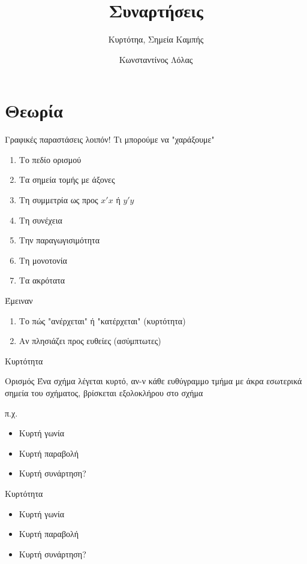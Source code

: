 \documentclass[greek]{beamer}
\title{Συναρτήσεις}
\subtitle{Κυρτότηα, Σημεία Καμπής}
\author[Λόλας]{Κωνσταντίνος Λόλας}
\date{}
\begin{document}
\begin{frame}
 \titlepage
\end{frame}

\section{Θεωρία}
\begin{frame}{Γραφικές παραστάσεις λοιπόν!}
 Τι μπορούμε να "χαράξουμε"
 \begin{enumerate}
  \item Το πεδίο ορισμού
  \item Τα σημεία τομής με άξονες
  \item Τη συμμετρία ως προς $x'x$ ή $y'y$
  \item Τη συνέχεια
  \item Την παραγωγισιμότητα
  \item Τη μονοτονία
  \item Τα ακρότατα
 \end{enumerate}
  Έμειναν
 \begin{enumerate}
  \item<3-> Το πώς "ανέρχεται" ή "κατέρχεται" (κυρτότητα)
  \item<4-> Αν πλησιάζει προς ευθείες (ασύμπτωτες)
 \end{enumerate}
\end{frame}

\begin{frame}{Κυρτότητα}
 \begin{block}{Ορισμός}
  Ένα σχήμα λέγεται κυρτό, αν-ν κάθε ευθύγραμμο τμήμα με άκρα εσωτερικά σημεία του σχήματος, βρίσκεται εξολοκλήρου στο σχήμα
 \end{block}
  π.χ.
 \begin{itemize}
  \item<3-> Κυρτή γωνία 
  \item<5-> Κυρτή παραβολή 
  \item<7-> Κυρτή συνάρτηση?
 \end{itemize}
\end{frame}

\begin{frame}{Κυρτότητα}
 \begin{itemize}
  \item<3-> Κυρτή γωνία 
  \item<5-> Κυρτή παραβολή 
  \item<7-> Κυρτή συνάρτηση?
 \end{itemize}
\end{frame}
\end{document}
